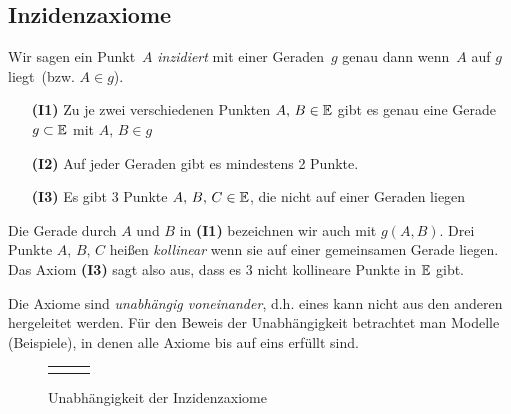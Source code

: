 



\subsection*{Inzidenzaxiome}

Wir sagen ein Punkt~$A$ {\em inzidiert} mit einer Geraden~$g$ genau dann 
wenn~$A$ \glqq auf $g$ liegt\grqq\ (bzw. $A\in g$).

\begin{enumerate}
    \item[{\bf(I1)}] Zu je zwei verschiedenen Punkten $A,\,B\in\mathbb E$ gibt es
    genau eine Gerade $g\subset\mathbb E$ mit $A,\,B\in g$
    \item[{\bf(I2)}] Auf jeder Geraden gibt es mindestens 2 Punkte.
    \item[{\bf (I3)}] Es gibt 3 Punkte $A,\,B,\,C\in\mathbb E$, die
    nicht auf einer Geraden liegen

\end{enumerate}


Die Gerade durch $A$ und $B$ in {\bf(I1)} bezeichnen wir auch
mit $g(A,B)$.
Drei Punkte $A,\,B,\,C$ heißen \emph{kollinear} 
wenn sie auf einer gemeinsamen Gerade liegen.
Das Axiom {\bf(I3)} sagt also aus, dass es 3 nicht kollineare Punkte
in $\mathbb E$ gibt.

Die Axiome sind {\em unabhängig voneinander}, d.h. eines kann nicht
aus den anderen hergeleitet werden. Für den Beweis der Unabhängigkeit
betrachtet man Modelle (Beispiele), in denen alle Axiome bis
auf eins erfüllt sind.

\begin{center}

	\begin{figure}[h]
		\begin{tabular}{ccc}
		
		&
		
		&
		
		\end{tabular}
		\caption{Unabhängigkeit der Inzidenzaxiome}
	\end{figure}
\end{center}

